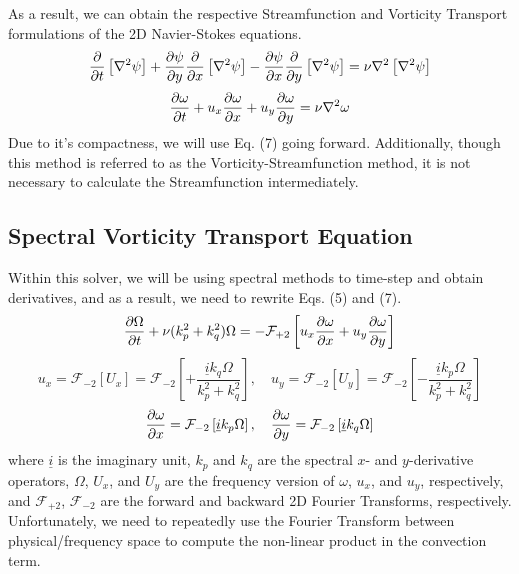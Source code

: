 \documentclass[12pt, reqno]{amsart}
\begin{document}
As a result, we can obtain the respective Streamfunction and Vorticity Transport formulations of the 2D Navier-Stokes equations.
\begin{equation}
    \pdv{}{t} \left[ \nabla^2 \psi \right] + \pdv{\psi}{y} \pdv{}{x} \left[ \nabla^2 \psi \right] - \pdv{\psi}{x} \pdv{}{y} \left[ \nabla^2 \psi \right] = \nu \nabla^2 \left[ \nabla^2 \psi \right]
\end{equation}
\begin{equation}
    \pdv{\omega}{t} + u_x \pdv{\omega}{x} + u_y \pdv{\omega}{y} = \nu \nabla^2 \omega
\end{equation}
Due to it's compactness, we will use Eq. (7) going forward. Additionally, though this method is referred to as the Vorticity-Streamfunction method, it is not necessary to calculate the Streamfunction intermediately.

\subsection{Spectral Vorticity Transport Equation}
Within this solver, we will be using spectral methods to time-step and obtain derivatives, and as a result, we need to rewrite Eqs. (5) and (7).
\begin{equation}
    \pdv{\Omega}{t} + \nu (k_p^2 + k_q^2) \Omega = - \mathcal{F}_{+2} \left[ u_x \pdv{\omega}{x} + u_y \pdv{\omega}{y} \right]
\end{equation}
\begin{equation}
    u_x = \mathcal{F}_{-2} \left[ U_x \right] = \mathcal{F}_{-2} \left[ + \frac{\underline{i} k_q \Omega}{k_p^2 + k_q^2} \right], \quad u_y = \mathcal{F}_{-2} \left[ U_y \right] = \mathcal{F}_{-2} \left[ - \frac{\underline{i} k_p \Omega}{k_p^2 + k_q^2} \right]
\end{equation}
\begin{equation}
    \pdv{\omega}{x} = \mathcal{F}_{-2} \left[\underline{i} k_p \Omega \right], \quad \pdv{\omega}{y} = \mathcal{F}_{-2} \left[\underline{i} k_q \Omega \right]
\end{equation}
where $\underline{i}$ is the imaginary unit, $k_p$ and $k_q$ are the spectral $x$- and $y$-derivative operators, $\Omega$, $U_x$, and $U_y$ are the frequency version of $\omega$, $u_x$, and $u_y$, respectively, and $\mathcal{F}_{+2}$, $\mathcal{F}_{-2}$ are the forward and backward 2D Fourier Transforms, respectively. Unfortunately, we need to repeatedly use the Fourier Transform between physical/frequency space to compute the non-linear product in the convection term.
\end{document}
